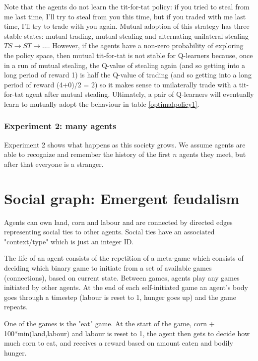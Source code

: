 \documentclass[a4paper]{report}
\begin{document}
Note that the agents do not learn the tit-for-tat policy: if you tried to steal from me last time, I'll try to steal from you this time, but if you traded with me last time, I'll try to trade with you again. Mutual adoption of this strategy has three stable states: mutual trading, mutual stealing and alternating unilateral stealing $TS \rightarrow ST \rightarrow ...$. However, if the agents have a non-zero probability of exploring the policy space, then mutual tit-for-tat is not stable for Q-learners because, once in a run of mutual stealing, the Q-value of stealing again (and so getting into a long period of reward 1) is half the Q-value of trading (and so getting into a long period of reward (4+0)/2 = 2) so it makes sense to unilaterally trade with a tit-for-tat agent after mutual stealing. Ultimately, a pair of Q-learners will eventually learn to mutually adopt the behaviour in table \ref{optimalpolicy1}.

\subsection{Experiment 2: many agents}

Experiment 2 shows what happens as this society grows. We assume agents are able to recognize and remember the history of the first $n$ agents they meet, but after that everyone is a stranger.


\chapter{Social graph: Emergent feudalism}

Agents can own land, corn and labour and are connected by directed edges representing social ties to other agents. Social ties have an associated "context/type" which is just an integer ID.

The life of an agent consists of the repetition of a meta-game which consists of deciding which binary game to initiate from a set of available games (connections), based on current state. Between games, agents play any games initiated by other agents. At the end of each self-initiated game an agent's body goes through a timestep (labour is reset to 1, hunger goes up) and the game repeats.

One of the games is the "eat" game. At the start of the game, corn += 100*min(land,labour) and labour is reset to 1, the agent then gets to decide how much corn to eat, and receives a reward based on amount eaten and bodily hunger.
\end{document}
